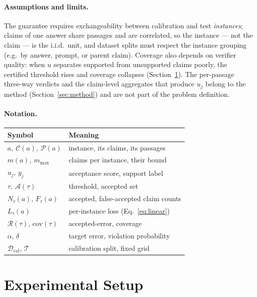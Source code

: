 \documentclass{article}
\begin{document}
\paragraph{Assumptions and limits.}
The guarantee requires exchangeability between calibration and test
\emph{instances}; claims of one answer share passages and are correlated, so
the instance --- not the claim --- is the i.i.d.\ unit, and dataset splits
must respect the instance grouping (e.g.\ by answer, prompt, or parent
claim). Coverage also depends on verifier quality: when $u$ separates
supported from unsupported claims poorly, the certified threshold rises and
coverage collapses (Section~\ref{sec:experiments}). The per-passage
three-way verdicts and the claim-level aggregates that produce $u_j$
belong to the method (Section~\ref{sec:method}) and are not part of the
problem definition.

\paragraph{Notation.}
\begin{center}
\begin{tabular}{@{}ll@{}}
\toprule
Symbol & Meaning \\
\midrule
$a,\ \mathcal{C}(a),\ \mathcal{P}(a)$ & instance, its claims, its passages \\
$m(a),\ m_{\max}$ & claims per instance, their bound \\
$u_j,\,y_j$ & acceptance score, support label \\
$\tau,\,\mathcal{A}(\tau)$ & threshold, accepted set \\
$N_\tau(a),\,F_\tau(a)$ & accepted, false-accepted claim counts \\
$L_\tau(a)$ & per-instance loss (Eq.~\eqref{eq:linear}) \\
$\mathcal{R}(\tau),\,\mathrm{cov}(\tau)$ & accepted-error, coverage \\
$\alpha,\,\delta$ & target error, violation probability \\
$\mathcal{D}_{\mathrm{cal}},\,\mathcal{T}$ & calibration split, fixed grid \\
\bottomrule
\end{tabular}
\end{center}


\section{Experimental Setup}
\label{sec:experiments}
\end{document}
